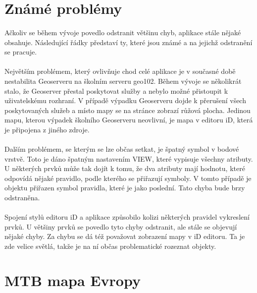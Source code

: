\documentclass[11pt,a4paper,titlepage,oneside]{book}
\begin{document}
		\section{Známé problémy}
			\paragraph{} Ačkoliv se během vývoje povedlo odstranit většinu chyb, aplikace stále nějaké obsahuje. Následující řádky představí ty, které jsou známé a na jejichž odstranění se pracuje.
			\paragraph{} Největším problémem, který ovlivňuje chod celé aplikace je v současné době nestabilita Geoserveru na školním serveru geo102. Během vývoje se několikrát stalo, že Geoserver přestal poskytovat služby a nebylo možné přistoupit k uživatelskému rozhraní. V případě výpadku Geoserveru dojde k přerušení všech poskytovaných služeb a místo mapy se na stránce zobrazí růžová plocha. Jedinou mapu, kterou výpadek školního Geoserveru neovlivní, je mapa v editoru iD, která je připojena z jiného zdroje.
			\paragraph{} Dalším problémem, se kterým se lze občas setkat, je špatný symbol v bodové vrstvě. Toto je dáno špatným nastavením VIEW, které vypisuje všechny atributy. U některých prvků může tak dojít k tomu, že dva atributy mají hodnotu, které odpovídá nějaké pravidlo, podle kterého se přiřazují symboly. V tomto případě je objektu přiřazen symbol pravidla, které je jako poslední. Tato chyba bude brzy odstraněna.
			\paragraph{} Spojení stylů editoru iD a aplikace způsobilo kolizi některých pravidel vykreslení prvků. U většiny prvků se povedlo tyto chyby odstranit, ale stále se objevují nějaké chyby. Za chybu se dá též považovat zobrazení mapy v iD editoru. Ta je zde velice světlá, takže je na ní občas problematické rozeznat objekty.

		\section{MTB mapa Evropy}

\end{document}
